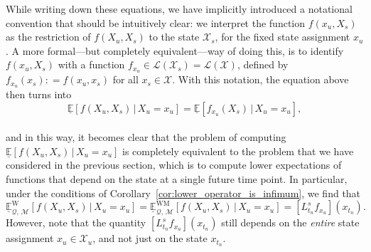 \documentclass[10pt,a4paper]{paper}
\theoremstyle{definition}
\newcommand{\states}{\mathcal{X}}
\newcommand{\gambles}{\mathcal{L}}
\newcommand{\gamblesX}{\gambles(\states)}
\newcommand{\rateset}{\mathcal{Q}}
\newcommand{\coloneqq}{:\!=}
\begin{document}
While writing down these equations, we have implicitly introduced a notational convention that should be intuitively clear: we interpret the function $f(x_u,X_s)$ as the restriction of $f(X_u,X_s)$ to the state $\states_s$, for the fixed state assignment $x_u$. A more formal---but completely equivalent---way of doing this, is to identify $f(x_u,X_s)$ with a function $f_{x_u}\in\gambles(\states_s)=\gamblesX$, defined by $f_{x_u}(x_s)\coloneqq f(x_u,x_s)$ for all $x_s\in\states$.
With this notation, the equation above then turns into
\begin{equation*}%
\underline{\mathbb{E}}[f(X_u,X_s)\,\vert\,X_u=x_u] = \underline{\mathbb{E}}[f_{x_u}(X_s)\,\vert\,X_u=x_u],
\end{equation*}\\[-14pt]
and in this way, it becomes clear that the problem of computing $\underline{\mathbb{E}}[f(X_u,X_s)\,\vert\,X_u=x_u]$ is completely equivalent to the problem that we have considered in the previous section, which is to compute lower expectations of functions that depend on the state at a single future time point.
In particular, under the conditions of Corollary~\ref{cor:lower_operator_is_infimum}, we find that
\begin{equation*}
\underline{\mathbb{E}}_{\rateset,\,\mathcal{M}}^{\mathrm{W}}[f(X_u,X_s)\,\vert\,X_u=x_u] = \underline{\mathbb{E}}_{\rateset,\,\mathcal{M}}^{\mathrm{WM}}[f(X_u,X_s)\,\vert\,X_u=x_u]=\left[L_{t_n}^sf_{x_u}\right](x_{t_n}).
\end{equation*}
However, note that the quantity $[L_{t_n}^sf_{x_u}](x_{t_n})$ still depends on the \emph{entire} state assignment $x_u\in\states_u$, and not just on the state $x_{t_n}$.
\end{document}
